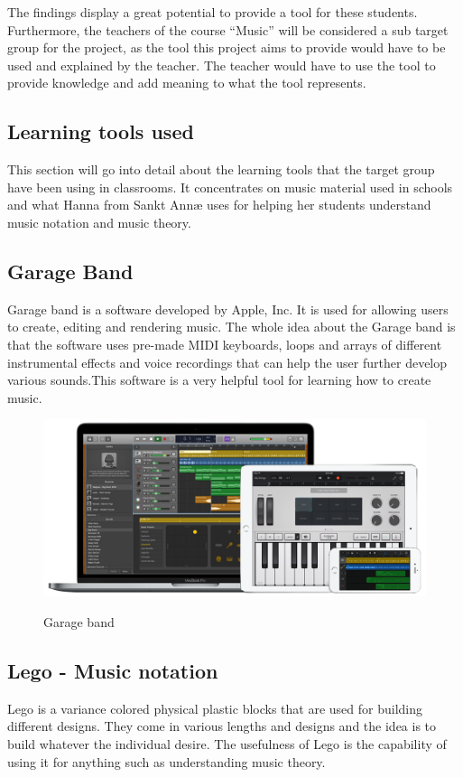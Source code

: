 The findings display a great potential to provide a tool for these students.
Furthermore, the teachers of the course “Music” will be considered a sub target group for the project, as the tool this project aims to provide would have to be used and explained by the teacher. The teacher would have to use the tool to provide knowledge and add meaning to what the tool represents.
 
 
\subsection{Learning tools used}%
This section will go into detail about the learning tools that the target group have been using in classrooms. It concentrates on music material used in schools and what Hanna from Sankt Annæ uses for helping her students understand music notation and music theory. 

\subsection{Garage Band}
Garage band is a software developed by Apple, Inc. It is used for allowing users to create, editing and rendering music. The whole idea about the Garage band is that the software uses pre-made MIDI keyboards, loops and arrays of different instrumental effects and voice recordings that can help the user further develop various sounds.This software is a very helpful tool for learning how to create music.
\begin{figure}[H]
	\centering
	\includegraphics[width=0.7\linewidth]{figure/Analysis/garageband}
	\label{fig:garageband}
	\caption{Garage band}
	
\end{figure}

\subsection{Lego - Music notation}
Lego is a variance colored physical plastic blocks that are used for building different designs. They come in various lengths and designs and the idea is to build whatever the individual desire. The usefulness of Lego is the capability of using it for anything such as understanding music theory.

